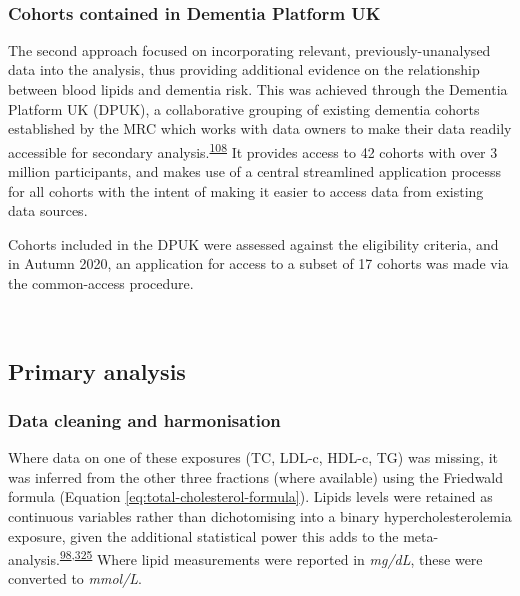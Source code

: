 \documentclass[a4paper, twoside]{templates/ociamthesis}
\begin{document}
~

\hypertarget{cohorts-contained-in-dementia-platform-uk}{%
\subsubsection{Cohorts contained in Dementia Platform UK}\label{cohorts-contained-in-dementia-platform-uk}}

The second approach focused on incorporating relevant, previously-unanalysed data into the analysis, thus providing additional evidence on the relationship between blood lipids and dementia risk. This was achieved through the Dementia Platform UK (DPUK), a collaborative grouping of existing dementia cohorts established by the MRC which works with data owners to make their data readily accessible for secondary analysis.\textsuperscript{\protect\hyperlink{ref-bauermeister2020}{108}} It provides access to 42 cohorts with over 3 million participants, and makes use of a central streamlined application processs for all cohorts with the intent of making it easier to access data from existing data sources.

Cohorts included in the DPUK were assessed against the eligibility criteria, and in Autumn 2020, an application for access to a subset of 17 cohorts was made via the common-access procedure.

~

\hypertarget{primary-analysis-1}{%
\subsection{Primary analysis}\label{primary-analysis-1}}

\hypertarget{data-cleaning-and-harmonisation}{%
\subsubsection{Data cleaning and harmonisation}\label{data-cleaning-and-harmonisation}}

Where data on one of these exposures (TC, LDL-c, HDL-c, TG) was missing, it was inferred from the other three fractions (where available) using the Friedwald formula (Equation \eqref{eq:total-cholesterol-formula}). Lipids levels were retained as continuous variables rather than dichotomising into a binary hypercholesterolemia exposure, given the additional statistical power this adds to the meta-analysis.\textsuperscript{\protect\hyperlink{ref-riley2020}{98},\protect\hyperlink{ref-ensor2018}{325}} Where lipid measurements were reported in \emph{mg/dL}, these were converted to \emph{mmol/L}.
\end{document}
